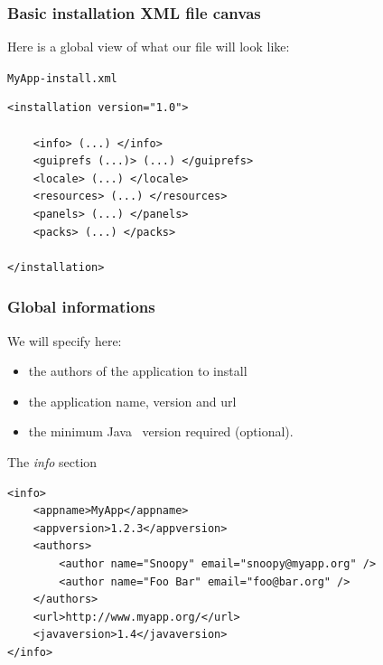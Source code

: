 \documentclass[compress,10pt]{beamer}
\begin{document}
\begin{frame}[containsverbatim]

\frametitle{Basic installation XML file canvas}

Here is a global view of what our file will look like:

\begin{block}{\texttt{MyApp-install.xml}}
\small
\begin{verbatim}
<installation version="1.0">

    <info> (...) </info>
    <guiprefs (...)> (...) </guiprefs>
    <locale> (...) </locale>
    <resources> (...) </resources>
    <panels> (...) </panels>
    <packs> (...) </packs>

</installation>
\end{verbatim}
\end{block}

\end{frame}


\begin{frame}[containsverbatim]

\frametitle{Global informations}

We will specify here:
  \begin{itemize}
      \item the authors of the application to install
      \item the application name, version and url
      \item the minimum Java\texttrademark~ version required (optional).
  \end{itemize}

\begin{block}{The \textsl{info} section}
\tiny
\begin{verbatim}
<info>
    <appname>MyApp</appname>
    <appversion>1.2.3</appversion>
    <authors>
        <author name="Snoopy" email="snoopy@myapp.org" />
        <author name="Foo Bar" email="foo@bar.org" />
    </authors>
    <url>http://www.myapp.org/</url>
    <javaversion>1.4</javaversion>
</info>
\end{verbatim}
\end{block}

\end{frame}

\end{document}
